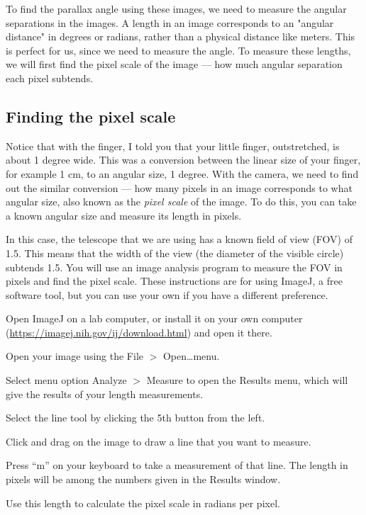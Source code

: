 To find the parallax angle using these images, we need to measure the angular separations in the images. A length in an image corresponds to an "angular distance" in degrees or radians, rather than a physical distance like meters. This is perfect for us, since we need to measure the angle. To measure these lengths, we will first find the pixel scale of the image --- how much angular separation each pixel subtends.

\subsection{Finding the pixel scale}

Notice that with the finger, I told you that your little finger, outstretched, is about 1 degree wide. This was a conversion between the linear size of your finger, for example 1 cm, to an angular size, 1 degree. With the camera, we need to find out the similar conversion --- how many pixels in an image corresponds to what angular size, also known as the \textit{pixel scale} of the image. To do this, you can take a known angular size and measure its length in pixels.

In this case, the telescope that we are using has a known field of view (FOV) of 1.5\textdegree. This means that the width of the view (the diameter of the visible circle) subtends 1.5\textdegree. You will use an image analysis program to measure the FOV in pixels and find the pixel scale. These instructions are for using ImageJ, a free software tool, but you can use your own if you have a different preference.

\begin{steps}
	\item Open ImageJ on a lab computer, or install it on your own computer (\url{https://imagej.nih.gov/ij/download.html}) and open it there.
	
	\item Open your image using the File $>$ Open\ldots menu.
	
	\item Select menu option Analyze $>$ Measure to open the Results menu, which will give the results of your length measurements.
	
	\item Select the line tool by clicking the 5th button from the left.
	
	\item Click and drag on the image to draw a line that you want to measure.
	
	\item Press ``m'' on your keyboard to take a measurement of that line. The length in pixels will be among the numbers given in the Results window.
	
	\item Use this length to calculate the pixel scale in radians per pixel.

\end{steps}

